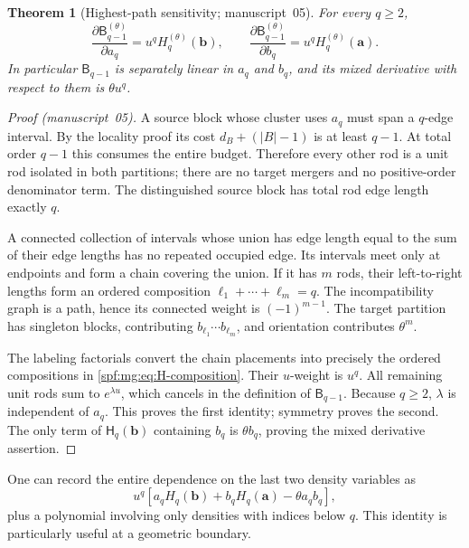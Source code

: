\documentclass[11pt]{article}
\numberwithin{equation}{section}
\newtheorem{theorem}{Theorem}[section]
\theoremstyle{definition}
\theoremstyle{remark}
\theoremstyle{definition}
\newcommand{\mga}{\boldsymbol a}
\newcommand{\mgb}{\boldsymbol b}
\begin{document}
\begin{theorem}[Highest-path sensitivity; manuscript~05]
\label{spf:mg:thm:sensitivity}
For every $q\ge2$,
\begin{equation}
 \boxed{\displaystyle
 \frac{\partial \mathsf B_{q-1}^{(\theta)}}{\partial a_q}
     =u^qH_q^{(\theta)}(\mgb),\qquad
 \frac{\partial \mathsf B_{q-1}^{(\theta)}}{\partial b_q}
     =u^qH_q^{(\theta)}(\mga).}
 \label{spf:mg:eq:sensitivity}
\end{equation}
In particular $\mathsf B_{q-1}$ is separately linear in $a_q$ and $b_q$, and its
mixed derivative with respect to them is $\theta u^q$.
\end{theorem}
\begin{proof}[Proof (manuscript~05)]
A source block whose cluster uses $a_q$ must span a $q$-edge interval.
By the locality proof its cost $d_B+(|B|-1)$ is at least $q-1$.
At total order $q-1$ this consumes the entire budget. Therefore every
other rod is a unit rod isolated in both partitions; there are no target
mergers and no positive-order denominator term. The distinguished source
block has total rod edge length exactly $q$.

A connected collection of intervals whose union has edge length equal
to the sum of their edge lengths has no repeated occupied edge. Its
intervals meet only at endpoints and form a chain covering the union.
If it has $m$ rods, their left-to-right lengths form an ordered composition
$\ell_1+\cdots+\ell_m=q$. The incompatibility graph is a path, hence its
connected weight is $(-1)^{m-1}$. The target partition has singleton
blocks, contributing $b_{\ell_1}\cdots b_{\ell_m}$, and orientation
contributes $\theta^m$.

The labeling factorials convert the chain placements into precisely the
ordered compositions in \eqref{spf:mg:eq:H-composition}. Their $u$-weight is
$u^q$. All remaining unit rods sum to $e^{\lambda u}$, which cancels in
the definition of $\mathsf B_{q-1}$. Because $q\ge2$, $\lambda$ is independent
of $a_q$. This proves the first identity; symmetry proves the second.
The only term of $\mathsf H_q(\mgb)$ containing $b_q$ is $\theta b_q$, proving
the mixed derivative assertion.
\end{proof}

One can record the entire dependence on the last two density variables as
\begin{equation}
 u^q\left[a_qH_q(\mgb)+b_qH_q(\mga)-\theta a_qb_q\right],
 \label{spf:mg:eq:last-dependence}
\end{equation}
plus a polynomial involving only densities with indices below $q$.
This identity is particularly useful at a geometric boundary.
\end{document}
